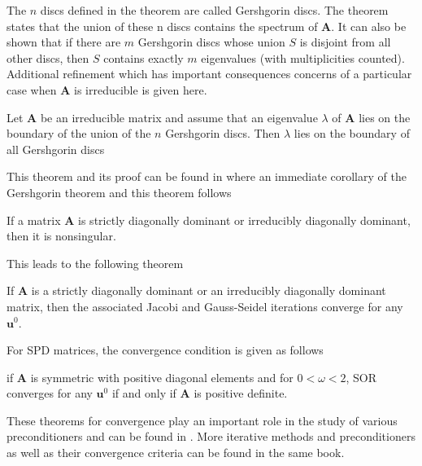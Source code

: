 The $n$ discs defined in the theorem are called Gershgorin discs. The theorem states that the union of these n discs contains the spectrum of $\boldsymbol{A}$. It can also be shown that if there are $m$ Gershgorin discs whose union $S$ is disjoint from all other discs, then $S$ contains exactly $m$ eigenvalues (with multiplicities counted). 
Additional refinement which has important consequences concerns of a particular case when $\boldsymbol{A}$ is irreducible is given here.
\begin{theorem}
Let $\boldsymbol{A}$ be an irreducible matrix and assume that an eigenvalue $\lambda$ of $\boldsymbol{A}$ lies on the boundary of the union of the $n$ Gershgorin discs. Then $\lambda$ lies on the boundary of all Gershgorin discs
\end{theorem}
This theorem and its proof can be found in \cite{doi:10.1137/1.9780898718003} where an immediate corollary of the Gershgorin theorem and this theorem follows
\begin{corollary}
If a matrix $\boldsymbol{A}$ is strictly diagonally dominant or irreducibly diagonally dominant, then it is nonsingular.
\end{corollary}
This leads to the following theorem
\begin{theorem}
If $\boldsymbol{A}$ is a strictly diagonally dominant or an irreducibly diagonally dominant matrix, then the associated Jacobi and Gauss-Seidel iterations converge for any $\boldsymbol{u}^0$.
\end{theorem}
For SPD matrices, the convergence condition is given as follows
\begin{theorem}
if $\boldsymbol{A}$ is symmetric with positive diagonal elements and for $0 < \omega < 2$, SOR converges for any $\boldsymbol{u}^0$ if and only if $\boldsymbol{A}$ is positive definite. 
\end{theorem}
These theorems for convergence play an important role in the study of various preconditioners and can be found in \cite{doi:10.1137/1.9780898718003}.
More iterative methods and preconditioners as well as their convergence criteria can be found in the same book.